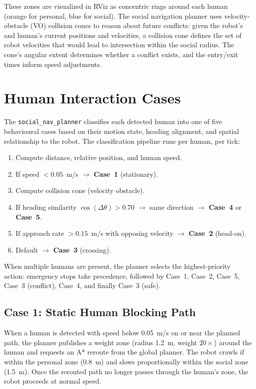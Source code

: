\documentclass[a4paper]{article}
\begin{document}
These zones are visualized in RViz as concentric rings around each human (orange for personal, blue for social). The social navigation planner uses velocity-obstacle (VO) collision cones to reason about future conflicts: given the robot's and human's current positions and velocities, a collision cone defines the set of robot velocities that would lead to intersection within the social radius. The cone's angular extent determines whether a conflict exists, and the entry/exit times inform speed adjustments.


\section{Human Interaction Cases}

The \texttt{social\_nav\_planner} classifies each detected human into one of five behavioural cases based on their motion state, heading alignment, and spatial relationship to the robot. The classification pipeline runs per human, per tick:

\begin{enumerate}
    \item Compute distance, relative position, and human speed.
    \item If speed $< 0.05$~m/s $\to$ \textbf{Case~1} (stationary).
    \item Compute collision cone (velocity obstacle).
    \item If heading similarity $\cos(\Delta\theta) > 0.70$ $\to$ same direction $\to$ \textbf{Case~4} or \textbf{Case~5}.
    \item If approach rate $> 0.15$~m/s with opposing velocity $\to$ \textbf{Case~2} (head-on).
    \item Default $\to$ \textbf{Case~3} (crossing).
\end{enumerate}

When multiple humans are present, the planner selects the highest-priority action: emergency stops take precedence, followed by Case~1, Case~2, Case~5, Case~3 (conflict), Case~4, and finally Case~3 (safe).

\subsection{Case 1: Static Human Blocking Path}

When a human is detected with speed below 0.05~m/s on or near the planned path, the planner publishes a weight zone (radius 1.2~m, weight $20\times$) around the human and requests an A* reroute from the global planner. The robot crawls if within the personal zone (0.8~m) and slows proportionally within the social zone (1.5~m). Once the rerouted path no longer passes through the human's zone, the robot proceeds at normal speed.
\end{document}
